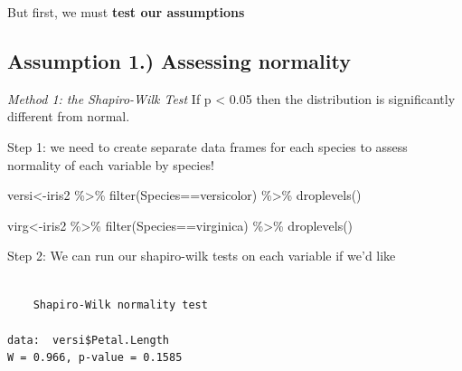 \documentclass[
  letterpaper,
  DIV=11,
  numbers=noendperiod]{scrartcl}
\newenvironment{Shaded}{\begin{snugshade}}{\end{snugshade}}
\newcommand{\CommentTok}[1]{\textcolor[rgb]{0.37,0.37,0.37}{#1}}
\newcommand{\FunctionTok}[1]{\textcolor[rgb]{0.28,0.35,0.67}{#1}}
\newcommand{\NormalTok}[1]{\textcolor[rgb]{0.00,0.23,0.31}{#1}}
\newcommand{\OtherTok}[1]{\textcolor[rgb]{0.00,0.23,0.31}{#1}}
\newcommand{\SpecialCharTok}[1]{\textcolor[rgb]{0.37,0.37,0.37}{#1}}
\newcommand{\StringTok}[1]{\textcolor[rgb]{0.13,0.47,0.30}{#1}}
\begin{document}
But first, we must \textbf{test our assumptions}

\subsection{\texorpdfstring{\textbf{Assumption 1.) Assessing
normality}}{Assumption 1.) Assessing normality}}

\emph{Method 1: the Shapiro-Wilk Test} If p \textless{} 0.05 then the
distribution is significantly different from normal.

Step 1: we need to create separate data frames for each species to
assess normality of each variable by species!

\begin{Shaded}
\begin{Highlighting}[]
\NormalTok{versi}\OtherTok{\textless{}{-}}\NormalTok{iris2 }\SpecialCharTok{\%\textgreater{}\%}
  \FunctionTok{filter}\NormalTok{(Species}\SpecialCharTok{==}\StringTok{\textquotesingle{}versicolor\textquotesingle{}}\NormalTok{) }\SpecialCharTok{\%\textgreater{}\%}
  \FunctionTok{droplevels}\NormalTok{()}

\NormalTok{virg}\OtherTok{\textless{}{-}}\NormalTok{iris2 }\SpecialCharTok{\%\textgreater{}\%}
  \FunctionTok{filter}\NormalTok{(Species}\SpecialCharTok{==}\StringTok{\textquotesingle{}virginica\textquotesingle{}}\NormalTok{) }\SpecialCharTok{\%\textgreater{}\%}
  \FunctionTok{droplevels}\NormalTok{()}
\end{Highlighting}
\end{Shaded}

\hfill\break

Step 2: We can run our shapiro-wilk tests on each variable if we'd like

\begin{Shaded}
\end{Shaded}

\begin{verbatim}

    Shapiro-Wilk normality test

data:  versi$Petal.Length
W = 0.966, p-value = 0.1585
\end{verbatim}

\begin{Shaded}
\end{Shaded}
\end{document}
